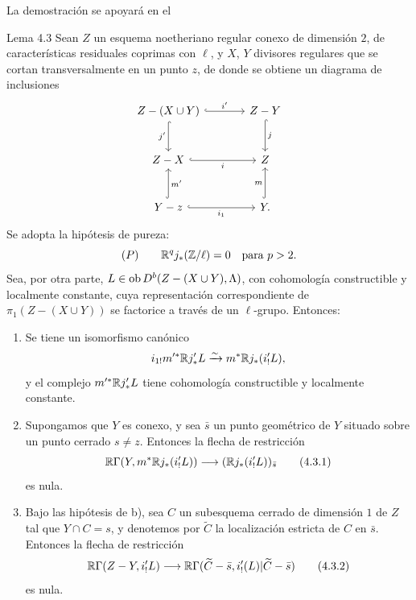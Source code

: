 La demostración se apoyará en el

\begin{statement}{Lema 4.3}
Sean $Z$ un esquema noetheriano regular conexo de dimensión $2$, de características residuales coprimas con $\ell$, y $X$, $Y$ divisores regulares que se cortan transversalmente en un punto $z$, de donde se obtiene un diagrama de inclusiones
\[
\begin{tikzcd}[column sep=large,row sep=large]
Z-(X\cup Y) \arrow[r,hook,"i'"] \arrow[d,hook,"j'"'] & Z-Y \arrow[d,hook,"j"]\\
Z-X \arrow[r,hook,"i"'] & Z\\
Y-z \arrow[r,hook,"i_1"'] \arrow[u,hook,"m'"'] & Y \arrow[u,hook,"m"] .
\end{tikzcd}
\]
Se adopta la hipótesis de pureza:
\[
(P)\qquad \mathbb{R}^qj_*(\mathbb Z/\ell)=0\quad\text{para }p>2.
\]
Sea, por otra parte, $L\in\operatorname{ob} D^b(Z-(X\cup Y),\Lambda)$, con cohomología constructible y localmente constante, cuya representación correspondiente de $\pi_1(Z-(X\cup Y))$ se factorice a través de un $\ell$-grupo. Entonces:
\begin{enumerate}[label=\alph*)]
\item Se tiene un isomorfismo canónico
\[
i_{1!}m'^*\mathbb{R} j'_*L\xrightarrow{\sim} m^*\mathbb{R} j_*(i'_!L),
\]
y el complejo $m'^*\mathbb{R} j'_*L$ tiene cohomología constructible y localmente constante.
\item Supongamos que $Y$ es conexo, y sea $\bar s$ un punto geométrico de $Y$ situado sobre un punto cerrado $s\ne z$. Entonces la flecha de restricción
\begin{equation}
\mathbb{R}\Gamma(Y,m^*\mathbb{R} j_*(i'_!L))\longrightarrow (\mathbb{R} j_*(i'_!L))_{\bar s}
\tag{4.3.1}
\end{equation}
es nula.
\item Bajo las hipótesis de b), sea $C$ un subesquema cerrado de dimensión $1$ de $Z$ tal que $Y\cap C=s$, y denotemos por $\widetilde C$ la localización estricta de $C$ en $\bar s$. Entonces la flecha de restricción
\begin{equation}
\mathbb{R}\Gamma(Z-Y,i'_!L)
\longrightarrow
\mathbb{R}\Gamma(\widetilde C-\bar s,i'_!(L)|\widetilde C-\bar s)
\tag{4.3.2}
\end{equation}
es nula.
\end{enumerate}
\end{statement}

